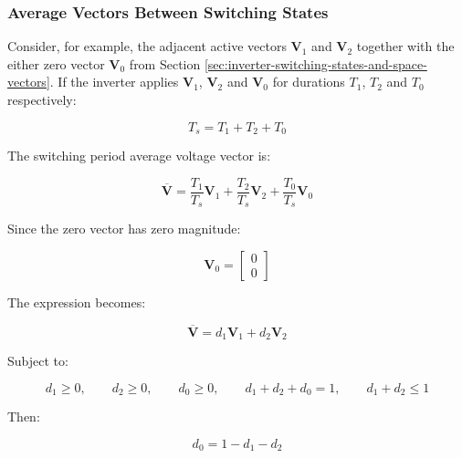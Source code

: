 \documentclass{article}
\begin{document}
\subsubsection{Average Vectors Between Switching States}
\label{sec:average-vectors-between-switching-states}

Consider, for example, the adjacent active vectors $\mathbf{V}_1$ and $\mathbf{V}_2$ together with the either zero vector $\mathbf{V}_0$ from Section \ref{sec:inverter-switching-states-and-space-vectors}. If the inverter applies $\mathbf{V}_1$, $\mathbf{V}_2$ and $\mathbf{V}_0$ for durations $T_1$, $T_2$ and $T_0$ respectively:

\begin{equation}
    T_s = T_1 + T_2 + T_0
\end{equation}

The switching period average voltage vector is:

\begin{equation}
    \overline{\mathbf{V}} = \frac{T_1}{T_s}\mathbf{V}_1 + \frac{T_2}{T_s}\mathbf{V}_2 + \frac{T_0}{T_s}\mathbf{V}_0    
\end{equation}

Since the zero vector has zero magnitude:

\begin{equation}
    \mathbf{V}_0 = 
    \begin{bmatrix}
        0 \\
        0
    \end{bmatrix}
\end{equation}

The expression becomes:

\begin{equation}
    \overline{\mathbf{V}} = d_1\mathbf{V}_1 + d_2\mathbf{V}_2    
\end{equation}

Subject to:

\begin{equation}
    d_1 \geq 0, \qquad
    d_2 \geq 0, \qquad
    d_0 \geq 0, \qquad
    d_1 + d_2 + d_0 = 1, \qquad
    d_1 + d_2 \leq 1
\end{equation}

Then:

\begin{equation}
    d_0 = 1 - d_1 - d_2
\end{equation}
\end{document}
